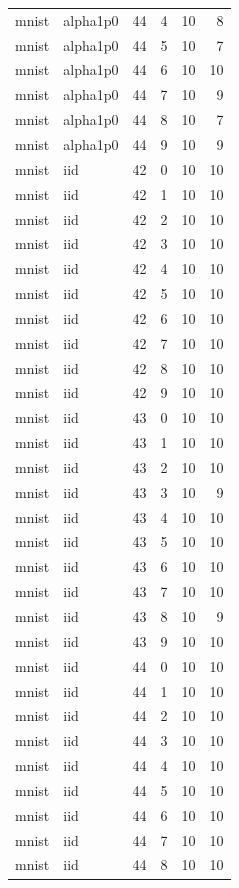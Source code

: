 \begin{tabular}{llrrrr}
mnist & alpha1p0 & 44 & 4 & 10 & 8 \\
mnist & alpha1p0 & 44 & 5 & 10 & 7 \\
mnist & alpha1p0 & 44 & 6 & 10 & 10 \\
mnist & alpha1p0 & 44 & 7 & 10 & 9 \\
mnist & alpha1p0 & 44 & 8 & 10 & 7 \\
mnist & alpha1p0 & 44 & 9 & 10 & 9 \\
mnist & iid & 42 & 0 & 10 & 10 \\
mnist & iid & 42 & 1 & 10 & 10 \\
mnist & iid & 42 & 2 & 10 & 10 \\
mnist & iid & 42 & 3 & 10 & 10 \\
mnist & iid & 42 & 4 & 10 & 10 \\
mnist & iid & 42 & 5 & 10 & 10 \\
mnist & iid & 42 & 6 & 10 & 10 \\
mnist & iid & 42 & 7 & 10 & 10 \\
mnist & iid & 42 & 8 & 10 & 10 \\
mnist & iid & 42 & 9 & 10 & 10 \\
mnist & iid & 43 & 0 & 10 & 10 \\
mnist & iid & 43 & 1 & 10 & 10 \\
mnist & iid & 43 & 2 & 10 & 10 \\
mnist & iid & 43 & 3 & 10 & 9 \\
mnist & iid & 43 & 4 & 10 & 10 \\
mnist & iid & 43 & 5 & 10 & 10 \\
mnist & iid & 43 & 6 & 10 & 10 \\
mnist & iid & 43 & 7 & 10 & 10 \\
mnist & iid & 43 & 8 & 10 & 9 \\
mnist & iid & 43 & 9 & 10 & 10 \\
mnist & iid & 44 & 0 & 10 & 10 \\
mnist & iid & 44 & 1 & 10 & 10 \\
mnist & iid & 44 & 2 & 10 & 10 \\
mnist & iid & 44 & 3 & 10 & 10 \\
mnist & iid & 44 & 4 & 10 & 10 \\
mnist & iid & 44 & 5 & 10 & 10 \\
mnist & iid & 44 & 6 & 10 & 10 \\
mnist & iid & 44 & 7 & 10 & 10 \\
mnist & iid & 44 & 8 & 10 & 10 \\

\end{tabular}

